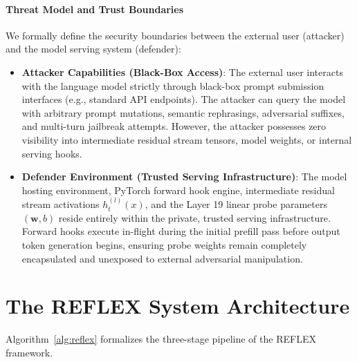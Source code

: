 \documentclass[manuscript,screen,review,anonymous]{acmart}
\begin{document}
\paragraph{Threat Model and Trust Boundaries}
We formally define the security boundaries between the external user (attacker) and the model serving system (defender):
\begin{itemize}[leftmargin=*]
    \item \textbf{Attacker Capabilities (Black-Box Access)}: The external user interacts with the language model strictly through black-box prompt submission interfaces (e.g., standard API endpoints). The attacker can query the model with arbitrary prompt mutations, semantic rephrasings, adversarial suffixes, and multi-turn jailbreak attempts. However, the attacker possesses zero visibility into intermediate residual stream tensors, model weights, or internal serving hooks.
    \item \textbf{Defender Environment (Trusted Serving Infrastructure)}: The model hosting environment, PyTorch forward hook engine, intermediate residual stream activations $h_t^{(l)}(x)$, and the Layer 19 linear probe parameters $(\mathbf{w}, b)$ reside entirely within the private, trusted serving infrastructure. Forward hooks execute in-flight during the initial prefill pass before output token generation begins, ensuring probe weights remain completely encapsulated and unexposed to external adversarial manipulation.
\end{itemize}

\section{The REFLEX System Architecture}
Algorithm~\ref{alg:reflex} formalizes the three-stage pipeline of the REFLEX framework.
\end{document}
